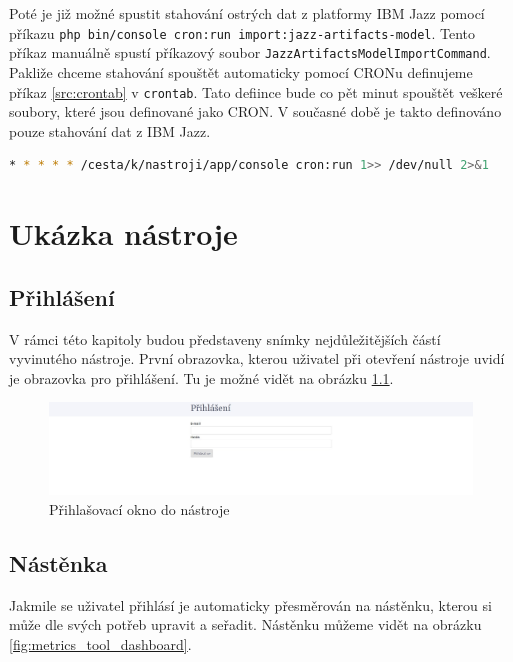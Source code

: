 \documentclass[czech,master]{diploma}
\begin{document}
Poté je již možné spustit stahování ostrých dat z platformy IBM Jazz pomocí příkazu \texttt{php bin/console cron:run import:jazz-artifacts-model}. Tento příkaz manuálně spustí příkazový soubor \texttt{JazzArtifactsModelImportCommand}. Pakliže chceme stahování spouštět automaticky pomocí CRONu definujeme příkaz  \ref{src:crontab} v \texttt{crontab}. Tato defiince bude co pět minut spouštět veškeré soubory, které jsou definované jako CRON. V současné době je takto definováno pouze stahování dat z IBM Jazz.

\begin{lstlisting}[language=bash,label=src:crontab,caption={Definice pro automatizaci stahování dat z IBM Jazz pomocí CRONu}]
* * * * * /cesta/k/nastroji/app/console cron:run 1>> /dev/null 2>&1
\end{lstlisting}

\chapter{Ukázka nástroje}

\section{Přihlášení}
V rámci této kapitoly budou představeny snímky nejdůležitějších částí vyvinutého nástroje. První obrazovka, kterou uživatel při otevření nástroje uvidí je obrazovka pro přihlášení. Tu je možné vidět na obrázku \ref{fig:metrics_tool_login}.

\begin{figure}[!ht]
    \centering
    \includegraphics[width=1\textwidth]{Diplomka/Figures/metrics_tool/login.jpg}
    \caption{Přihlašovací okno do nástroje}
    \label{fig:metrics_tool_login}
\end{figure}

\newpage
\section{Nástěnka}

Jakmile se uživatel přihlásí je automaticky přesměrován na nástěnku, kterou si může dle svých potřeb upravit a seřadit. Nástěnku můžeme vidět na obrázku \ref{fig:metrics_tool_dashboard}.
\end{document}
